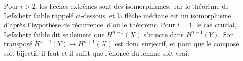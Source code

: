 \documentclass[12pt,a4paper]{article}
\theoremstyle{plain}
\theoremstyle{definition}
\theoremstyle{remark}
\begin{document}
Pour $i > 2$, les fl\`eches extr\'emes sont des isomorphismes, par le th\'eor\`eme de Lefschetz faible rappel\'e ci-dessous, et la fl\`eche m\'ediane est un isomorphisme d'apr\`es l'hypoth\`ese de r\'ecurrence, d'o\`u le th\'eor\`eme. Pour $i = 1$, le cas crucial, Lefschetz faible dit seulement que $H^{n-1}(X)$ s'injecte dans $H^{n-1}(Y)$. Son transpos\'e $H^{n-1}(Y) \to H^{n+1}(X)$ est donc surjectif, et pour que le compos\'e soit bijectif, il faut et il suffit que l'\'enonc\'e du lemme soit vrai.
\end{document}
